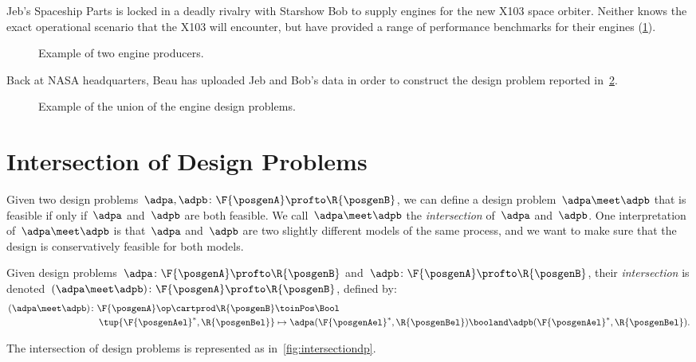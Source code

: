 \begin{example}
    Jeb's Spaceship Parts is locked in a deadly rivalry with Starshow Bob to supply engines for the new X103 space orbiter.
    Neither knows the exact operational scenario that the X103 will encounter, but have provided a range of performance benchmarks for their engines (\cref{fig:exunion_1}).
    \begin{figure}[h!]
        \centering
        \caption{Example of two engine producers. }
        \label{fig:exunion_1}
    \end{figure}
    Back at NASA headquarters, Beau has uploaded Jeb and Bob's data in order to construct the design problem reported in~\cref{fig:exunion_2}.
    \begin{figure}[h!]
        \centering
        \caption{Example of the union of the engine design problems. }
        \label{fig:exunion_2}
    \end{figure}
\end{example}

\section{Intersection of Design Problems}

Given two design problems~$\adpa, \adpb \colon \F{\posgenA} \profto \R{\posgenB}$, we can define a design problem~$\adpa \meet \adpb$ that is feasible if only if~$\adpa$ and~$\adpb$ are both feasible.
We call~$\adpa \meet \adpb$ the \emph{intersection} of~$\adpa$ and~$\adpb$.
One interpretation of~$\adpa \meet \adpb$ is that~$\adpa$ and~$\adpb$ are two slightly different models of the same process, and we want to make sure that the design is conservatively feasible for both models.

\begin{definition}
    \label{def:intersection_dp}
    \label{def:dp-intersection}
    Given design problems~$\adpa\colon \F{\posgenA} \profto \R{\posgenB}$ and~$\adpb\colon \F{\posgenA} \profto \R{\posgenB}$,
    their \emph{intersection} is denoted~$(\adpa \meet \adpb)\colon \F{\posgenA} \profto \R{\posgenB}$, defined by:
    \begin{equation}
        \begin{aligned}
            (\adpa \meet \adpb)
            \colon \F{\posgenA}\op \cartprod \R{\posgenB} & \toinPos \Bool                                                                                     \\
            \tup{\F{\posgenAel}^*, \R{\posgenBel}}        & \mapsto \adpa(\F{\posgenAel}^*, \R{\posgenBel}) \booland  \adpb(\F{\posgenAel}^*, \R{\posgenBel}). 
        \end{aligned}
    \end{equation}
\end{definition}
The intersection of design problems is represented as in~\cref{fig:intersectiondp}.

